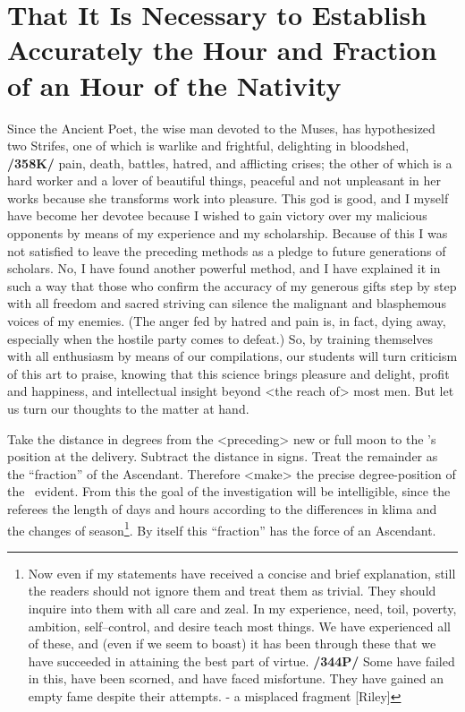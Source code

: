 \section{That It Is Necessary to Establish Accurately the Hour and Fraction of an Hour of the Nativity}
 
Since the Ancient Poet, the wise man devoted to the Muses, has hypothesized two Strifes, one of which is warlike and frightful, delighting in bloodshed, \textbf{/358K/} pain, death, battles, hatred, and afflicting crises; the other of which is a hard worker and a lover of beautiful things, peaceful and not unpleasant in her works because she transforms work into pleasure. This god is good, and I myself have become her devotee because I wished to gain victory over my malicious opponents by means of my experience and my scholarship. Because of this I was not satisfied to leave the preceding methods as a pledge to future generations of scholars. No, I have found another powerful method, and I have explained it in such a way that those who confirm the accuracy of my generous gifts step by step with all freedom and sacred striving can silence the malignant and blasphemous voices of my enemies. (The anger fed by hatred and pain is, in fact, dying away, especially when the hostile party comes to defeat.) So, by training themselves with all enthusiasm by means of our compilations, our students will turn criticism of this art to praise, knowing that this science brings pleasure and delight, profit and happiness, and intellectual insight beyond <the reach of> most men. But let us turn our thoughts to the matter at hand.

Take  the distance in degrees from the <preceding> new or full moon to the \Moon’s position at the delivery. Subtract the distance in signs. Treat the remainder as the “fraction” of the Ascendant. Therefore <make> the precise degree-position of the \Moon\, evident. From this the goal of the investigation will be intelligible, since the \Sun\, referees the length of days and hours according to the differences in klima and the changes of season\footnote{Now even if my statements have received a concise and brief explanation, still the readers should not ignore them and treat them as trivial. They should inquire into them with all care and zeal. In my experience, need, toil, poverty, ambition, self–control, and desire teach most things. We have experienced all of these, and (even if we seem to boast) it has been through these that we have succeeded in attaining the best part of virtue. \textbf{/344P/} Some have failed in this, have been scorned, and have faced misfortune. They have gained an empty fame despite their attempts. - a misplaced fragment [Riley]}. By itself this “fraction” has the force of an Ascendant. 

